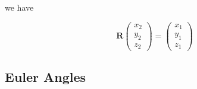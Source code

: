\documentclass[compress]{beamer}
\begin{document}
\begin{frame}[fragile]
  we have

  \begin{equation*}
    \mathbf R
    \left(
      \begin{matrix}
        x_{2}\\
        y_{2}\\
        z_{2}
      \end{matrix}\right)
    = \left(
      \begin{matrix}
        x_{1}\\
        y_{1}\\
        z_{1}
      \end{matrix}\right)
  \end{equation*}

\end{frame}

\subsection*{Euler Angles}
\label{sec:euler-angles}
\end{document}

